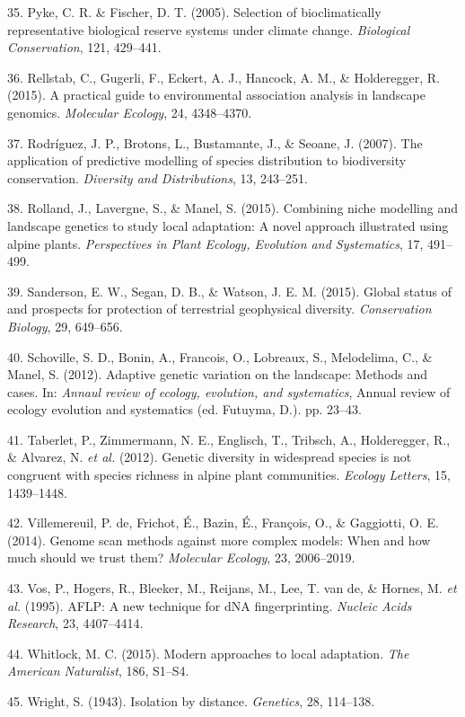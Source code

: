 \documentclass[11pt,]{article}
\begin{document}
\hypertarget{ref-r247}{}
35. Pyke, C. R. \& Fischer, D. T. (2005). Selection of bioclimatically
representative biological reserve systems under climate change.
\emph{Biological Conservation}, 121, 429--441.

\hypertarget{ref-r489}{}
36. Rellstab, C., Gugerli, F., Eckert, A. J., Hancock, A. M., \&
Holderegger, R. (2015). A practical guide to environmental association
analysis in landscape genomics. \emph{Molecular Ecology}, 24,
4348--4370.

\hypertarget{ref-r493}{}
37. Rodríguez, J. P., Brotons, L., Bustamante, J., \& Seoane, J. (2007).
The application of predictive modelling of species distribution to
biodiversity conservation. \emph{Diversity and Distributions}, 13,
243--251.

\hypertarget{ref-r485}{}
38. Rolland, J., Lavergne, S., \& Manel, S. (2015). Combining niche
modelling and landscape genetics to study local adaptation: A novel
approach illustrated using alpine plants. \emph{Perspectives in Plant
Ecology, Evolution and Systematics}, 17, 491--499.

\hypertarget{ref-r440}{}
39. Sanderson, E. W., Segan, D. B., \& Watson, J. E. M. (2015). Global
status of and prospects for protection of terrestrial geophysical
diversity. \emph{Conservation Biology}, 29, 649--656.

\hypertarget{ref-r480}{}
40. Schoville, S. D., Bonin, A., Francois, O., Lobreaux, S., Melodelima,
C., \& Manel, S. (2012). Adaptive genetic variation on the landscape:
Methods and cases. In: \emph{Annaul review of ecology, evolution, and
systematics}, Annual review of ecology evolution and systematics (ed.
Futuyma, D.). pp. 23--43.

\hypertarget{ref-r486}{}
41. Taberlet, P., Zimmermann, N. E., Englisch, T., Tribsch, A.,
Holderegger, R., \& Alvarez, N. \emph{et al.} (2012). Genetic diversity
in widespread species is not congruent with species richness in alpine
plant communities. \emph{Ecology Letters}, 15, 1439--1448.

\hypertarget{ref-r495}{}
42. Villemereuil, P. de, Frichot, É., Bazin, É., François, O., \&
Gaggiotti, O. E. (2014). Genome scan methods against more complex
models: When and how much should we trust them? \emph{Molecular
Ecology}, 23, 2006--2019.

\hypertarget{ref-r453}{}
43. Vos, P., Hogers, R., Bleeker, M., Reijans, M., Lee, T. van de, \&
Hornes, M. \emph{et al.} (1995). AFLP: A new technique for dNA
fingerprinting. \emph{Nucleic Acids Research}, 23, 4407--4414.

\hypertarget{ref-r490}{}
44. Whitlock, M. C. (2015). Modern approaches to local adaptation.
\emph{The American Naturalist}, 186, S1--S4.

\hypertarget{ref-r259}{}
45. Wright, S. (1943). Isolation by distance. \emph{Genetics}, 28,
114--138.

% 
% 
\end{document}
